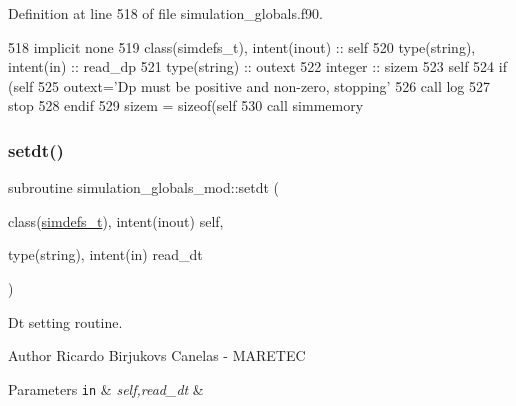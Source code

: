 Definition at line 518 of file simulation\+\_\+globals.\+f90.


\begin{DoxyCode}
518     \textcolor{keywordtype}{implicit none}
519     \textcolor{keywordtype}{class}(simdefs\_t), \textcolor{keywordtype}{intent(inout)} :: self
520     \textcolor{keywordtype}{type}(string), \textcolor{keywordtype}{intent(in)} :: read\_dp
521     \textcolor{keywordtype}{type}(string) :: outext
522     \textcolor{keywordtype}{integer} :: sizem
523     self%
524     \textcolor{keywordflow}{if} (self%
525         outext=\textcolor{stringliteral}{'Dp must be positive and non-zero, stopping'}
526         \textcolor{keyword}{call }log%
527         stop
528 \textcolor{keywordflow}{    endif}
529     sizem = sizeof(self%
530     \textcolor{keyword}{call }simmemory%
\end{DoxyCode}
\mbox{\label{namespacesimulation__globals__mod_aecf75eeccef4eeae6d10ab26cf2dcfcf}} 
\subsubsection{\texorpdfstring{setdt()}{setdt()}}
{\footnotesize\ttfamily subroutine simulation\+\_\+globals\+\_\+mod\+::setdt (\begin{DoxyParamCaption}\item[{class(\mbox{\hyperlink{structsimulation__globals__mod_1_1simdefs__t}{simdefs\+\_\+t}}), intent(inout)}]{self,  }\item[{type(string), intent(in)}]{read\+\_\+dt }\end{DoxyParamCaption})\hspace{0.3cm}{\ttfamily [private]}}



Dt setting routine. 

\begin{DoxyAuthor}{Author}
Ricardo Birjukovs Canelas -\/ M\+A\+R\+E\+T\+EC 
\end{DoxyAuthor}

\begin{DoxyParams}[1]{Parameters}
\mbox{\tt in}  & {\em self,read\+\_\+dt} & \\
\hline
\end{DoxyParams}


